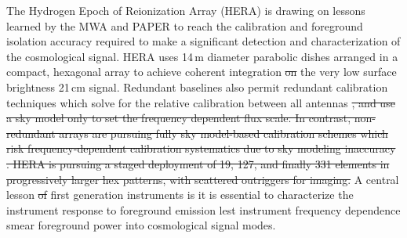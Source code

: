 \documentclass{emulateapj}
\providecommand{\DIFadd}[1]{{\protect\color{blue}\uwave{#1}}} %
\providecommand{\DIFdel}[1]{{\protect\color{red}\sout{#1}}}                      %
\providecommand{\DIFaddbegin}{} %
\providecommand{\DIFaddend}{} %
\providecommand{\DIFdelbegin}{} %
\providecommand{\DIFdelend}{} %
\begin{document}
The Hydrogen Epoch of Reionization Array (HERA) \DIFdelbegin %
\DIFdelend \DIFaddbegin \citep[][deBoer et al. (in prep)]{PoberNextGen} \DIFaddend is drawing on lessons learned by the MWA and PAPER to reach the calibration and foreground isolation accuracy required to make a significant detection and characterization of the cosmological signal. HERA uses 14\,m diameter parabolic dishes arranged in a compact, hexagonal array to achieve coherent integration \DIFdelbegin \DIFdel{on }\DIFdelend \DIFaddbegin \DIFadd{of }\DIFaddend the very low surface brightness 21\,cm signal. Redundant baselines also permit redundant calibration techniques which solve for the relative calibration between all antennas \DIFdelbegin %
\DIFdel{, and use a sky model only to set the frequency dependent flux scale. In contrast, non-redundant arrays are pursuing fully sky model-based calibration schemes which risk frequency-dependent calibration systematics due to sky modeling inaccuracy }%
\DIFdel{. HERA is pursuing a staged deployment of 19, 127, and finally 331 elements in progressively larger hex patterns, with scattered outriggers for imaging. }\DIFdelend \DIFaddbegin \citep{redundant3, redundant4, liu2010,zheng14}\DIFadd{. }\DIFaddend A central lesson \DIFdelbegin \DIFdel{of }\DIFdelend \DIFaddbegin \DIFadd{from }\DIFaddend first generation instruments is \DIFaddbegin \DIFadd{that }\DIFaddend it is essential to characterize the instrument response to foreground emission lest instrument frequency dependence smear foreground power into cosmological signal modes. 

\end{document}
